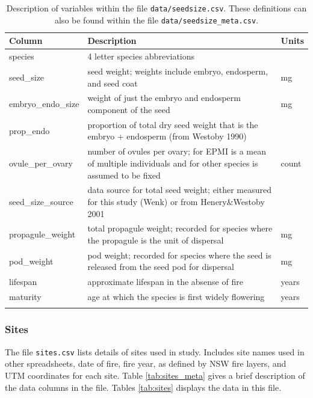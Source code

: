 \documentclass[10pt,twoside]{article}\usepackage[]{graphicx}\usepackage[]{color}
\begin{document}
\begingroup\small
\begin{longtable}{p{4cm}p{10cm}p{2cm}}
\caption{Description of variables within the file \texttt{data/seedsize.csv}. These definitions can also be found within the file \texttt{data/seedsize\_meta.csv}.} \\ 
  \hline
Column & Description & Units \\ 
  \hline
species & 4 letter species abbreviations &  \\ 
  seed\_size & seed weight; weights include embryo, endosperm, and seed coat & mg \\ 
  embryo\_endo\_size & weight of just the embryo and endosperm component of the seed & mg \\ 
  prop\_endo & proportion of total dry seed weight that is the embryo + endosperm (from Westoby 1990) &  \\ 
  ovule\_per\_ovary & number of ovules per ovary; for EPMI is a mean of multiple individuals and for other species is assumed to be fixed & count \\ 
  seed\_size\_source & data source for total seed weight; either measured for this study (Wenk) or from Henery\&Westoby 2001 &  \\ 
  propagule\_weight & total propagule weight; recorded for species where the propagule is the unit of dispersal & mg \\ 
  pod\_weight & pod weight; recorded for species where the seed is released from the seed pod for dispersal & mg \\ 
  lifespan & approximate lifespan in the absense of fire & years \\ 
  maturity & age at which the species is first widely flowering  & years \\ 
   \hline
\hline
\label{tab:seedsize_meta}
\end{longtable}
\endgroup


\subsubsection{Sites}
The file \texttt{sites.csv} lists details of sites used in study. Includes site names used in other spreadsheets, date of fire, fire year, as defined by NSW fire layers, and UTM coordinates for each site. Table \ref{tab:sites_meta} gives a brief description of the data columns in the file. Tables \ref{tab:sites} displays the data in this file.
\end{document}
